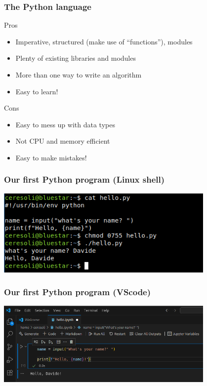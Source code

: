 \documentclass[handout]{beamer}
\begin{document}
\begin{frame}[fragile]
  \frametitle{The Python language}
  \begin{block}{Pros}
    \begin{itemize}
    \item Imperative, structured (make use of ``functions''), modules
    \item Plenty of existing libraries and modules
    \item More than one way to write an algorithm
    \item {\color{green} Easy to learn!}
    \end{itemize}
  \end{block}\pause
  \begin{block}{Cons}
    \begin{itemize}
    \item Easy to mess up with data types
    \item Not CPU and memory efficient
    \item {\color{red} Easy to make mistakes!}
    \end{itemize}
  \end{block}
\end{frame}

\begin{frame}[fragile]
  \frametitle{Our first Python program (Linux shell)}
  \begin{center}
  \includegraphics[width=0.8\textwidth]{hello_cli.png}
  \end{center}
\end{frame}

\begin{frame}[fragile]
  \frametitle{Our first Python program (VScode)}
  \begin{center}
  \includegraphics[width=0.8\textwidth]{hello_vscode.png}
  \end{center}
\end{frame}
\end{document}
